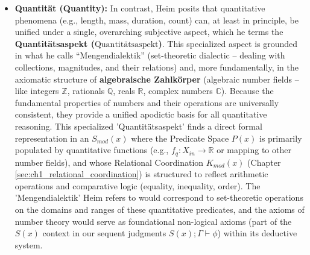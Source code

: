 \documentclass[
    12pt,              %
    a4paper,           %
    headings=normal,   %
    twoside=true,      %
    BCOR=8mm,          %
]{scrbook}
\newcommand{\q}[1]{\enquote{#1}}
\newcommand{\quantitaetsaspekt}{\text{Quantitätsaspekt}}
\begin{document}
\begin{itemize}
    \item   \textbf{Quantität (Quantity):} In contrast, Heim posits that quantitative phenomena (e.g., length, mass, duration, count) can, at least in principle, be unified under a single, overarching subjective aspect, which he terms the \textbf{Quantitätsaspekt (\(\quantitaetsaspekt\))}. This specialized aspect is grounded in what he calls \q{Mengendialektik} (set-theoretic dialectic – dealing with collections, magnitudes, and their relations) and, more fundamentally, in the axiomatic structure of \textbf{algebraische Zahlkörper} (algebraic number fields – like integers \(\mathbb{Z}\), rationals \(\mathbb{Q}\), reals \(\mathbb{R}\), complex numbers \(\mathbb{C}\)). Because the fundamental properties of numbers and their operations are universally consistent, they provide a unified apodictic basis for all quantitative reasoning.
        This specialized 'Quantitätsaspekt' finds a direct formal representation in an \(S_{mod}(x)\) where the Predicate Space \(P(x)\) is primarily populated by quantitative functions (e.g., \(f_q: X_{in} \to \mathbb{R}\) or mapping to other number fields), and whose Relational Coordination \(K_{mod}(x)\) (Chapter \ref{sec:ch1_relational_coordination}) is structured to reflect arithmetic operations and comparative logic (equality, inequality, order). The 'Mengendialektik' Heim refers to would correspond to set-theoretic operations on the domains and ranges of these quantitative predicates, and the axioms of number theory would serve as foundational non-logical axioms (part of the \(S(x)\) context in our sequent judgments \(S(x);\Gamma \vdash \phi\)) within its deductive system.
\end{itemize}
\end{document}

